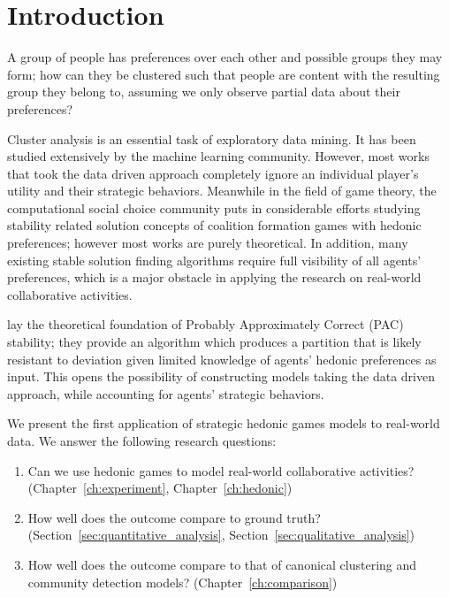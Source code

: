 
\chapter{Introduction}
\label{ch:intro}

A group of people has preferences over each other and possible groups they may
form; how can they be clustered such that people are content with the resulting
group they belong to, assuming we only observe partial data about their
preferences?

Cluster analysis is an essential task of exploratory data mining.
It has been studied extensively by the machine learning community.
However, most works that took the data driven approach completely ignore an
individual player's utility and their strategic behaviors.
Meanwhile in the field of game theory, the computational social choice
community puts in considerable efforts studying stability related solution
concepts of coalition formation games with hedonic preferences;
however most works are purely theoretical.
In addition, many existing stable solution finding algorithms require full
visibility of all agents' preferences, which is a major obstacle in applying
the research on real-world collaborative activities.

 lay the theoretical foundation of Probably
Approximately Correct (PAC) stability; they provide an algorithm which
produces a partition that is likely resistant to deviation given limited
knowledge of agents' hedonic preferences as input.
This opens the possibility of constructing models taking the data driven
approach, while accounting for agents' strategic behaviors.

We present the first application of strategic hedonic games models to
real-world data.
We answer the following research questions:
\begin{enumerate}
    \item Can we use hedonic games to model real-world collaborative
      activities? (Chapter~\ref{ch:experiment}, Chapter~\ref{ch:hedonic})
    \item How well does the outcome compare to ground truth?
      (Section~\ref{sec:quantitative_analysis},
      Section~\ref{sec:qualitative_analysis})
    \item How well does the outcome compare to that of canonical clustering
      and community detection models? (Chapter~\ref{ch:comparison})
\end{enumerate}

